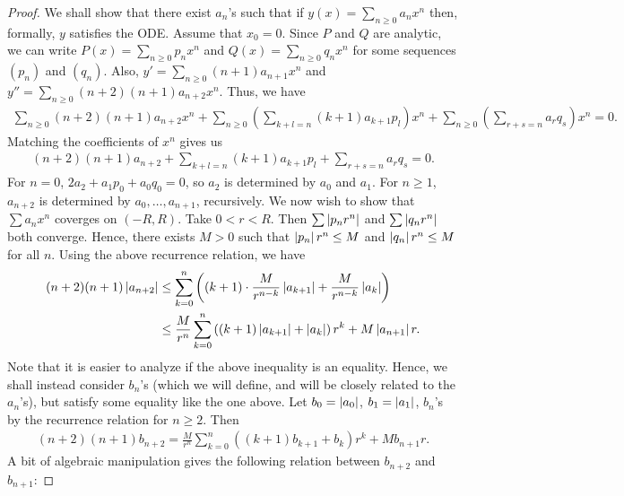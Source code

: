 \begin{proof}
    We shall show that there exist $a_{n}$'s such that if $y(x) = \sum_{n \geq 0} a_{n} x^{n}$ then, formally, $y$ satisfies the ODE. Assume that $x_{0} = 0$. Since $P$ and $Q$ are analytic, we can write $P(x) = \sum_{n \geq 0} p_{n} x^{n}$ and $Q(x) = \sum_{n \geq 0} q_{n} x^{n}$ for some sequences $(p_{n})$ and $(q_{n})$. Also, $y' = \sum_{n \geq 0} (n+1) a_{n+1} x^{n}$ and $y'' = \sum_{n \geq 0} (n+2)(n+1) a_{n+2} x^{n}$. Thus, we have
    \begin{align}
        \sum_{n \geq 0} (n+2)(n+1) a_{n+2} x^{n} + \sum_{n\geq 0} \left( \sum_{k+l=n} (k+1) a_{k+1} p_{l} \right) x^{n} + \sum_{n \geq 0} \left( \sum_{r+s=n} a_{r} q_{s} \right) x^{n} = 0.
    \end{align}
    Matching the coefficients of $x^{n}$ gives us
    \begin{align}
        (n+2)(n+1) a_{n+2} + \sum_{k+l=n} (k+1) a_{k+1} p_{l} + \sum_{r+s=n} a_{r} q_{s} = 0.
    \end{align}
    For $n = 0$, $2a_{2} + a_{1} p_{0} + a_{0} q_{0} = 0$, so $a_{2}$ is determined by $a_{0}$ and $a_{1}$. For $n \geq 1$, $a_{n+2}$ is determined by $a_{0},\ldots,a_{n+1}$, recursively. We now wish to show that $\sum a_{n} x^{n}$ coverges on $(-R,R)$. Take $0 < r < R$. Then $\sum \left| p_{n} r^{n} \right|$ and $\sum \left| q_{n} r^{n} \right|$ both converge. Hence, there exists $M > 0$ such that $\left| p_{n} \right| r^{n} \leq M$ and $\left| q_{n} \right| r^{n} \leq M$ for all $n$. Using the above recurrence relation, we have
    \begin{align}
        (n+2)(n+1)\left| a_{n+2} \right| &\leq \sum_{k=0}^{n} \left( (k+1) \cdot \frac{M}{r^{n-k}} \left| a_{k+1} \right| + \frac{M}{r^{n-k}} \left| a_{k} \right| \right) \notag \\ &\leq \frac{M}{r^{n}} \sum_{k=0}^{n} \left( (k+1) \left| a_{k+1} \right| + \left| a_{k} \right| \right)r^{k} + M \left| a_{n+1} \right| r.
    \end{align}
    Note that it is easier to analyze if the above inequality is an equality. Hence, we shall instead consider $b_{n}$'s (which we will define, and will be closely related to the $a_{n}$'s), but satisfy some equality like the one above. Let $b_{0} = \left| a_{0} \right|$, $b_{1} = \left| a_{1} \right|$, $b_{n}$'s by the recurrence relation for $n \geq 2$. Then
    \begin{align}
        (n+2)(n+1) b_{n+2} = \frac{M}{r^{n}} \sum_{k=0}^{n} \left( (k+1) b_{k+1} + b_{k} \right) r^{k} + M b_{n+1} r.
    \end{align}
    A bit of algebraic manipulation gives the following relation between $b_{n+2}$ and $b_{n+1}$:

\end{proof}
